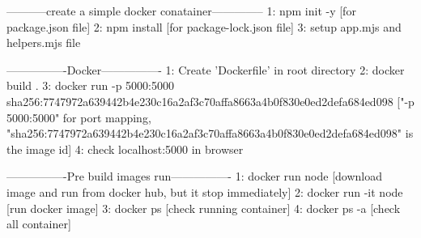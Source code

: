 -----------create a simple docker conatainer--------------
1: npm init -y  [for package.json file]
2: npm install [for package-lock.json file]
3: setup app.mjs and helpers.mjs file


----------------Docker----------------
1: Create 'Dockerfile' in root directory
2: docker build .
3: docker run -p 5000:5000 sha256:7747972a639442b4e230c16a2af3c70affa8663a4b0f830e0ed2defa684ed098 ["-p 5000:5000" for port mapping, "sha256:7747972a639442b4e230c16a2af3c70affa8663a4b0f830e0ed2defa684ed098" is the image id]
4: check localhost:5000 in browser


----------------Pre build images run----------------
1: docker run node [download image and run from docker hub, but it stop immediately]
2: docker run -it node [run docker image]
3: docker ps [check running container]
4: docker ps -a [check all container]

